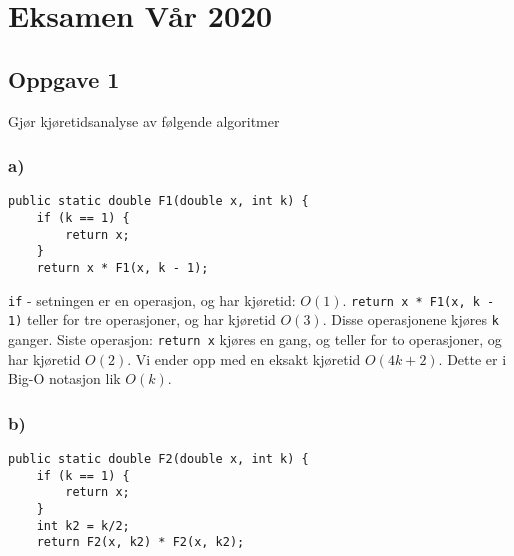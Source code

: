\documentclass{article}
\begin{document}
    \section{Eksamen Vår 2020}
    \subsection{Oppgave 1}
    Gjør kjøretidsanalyse av følgende algoritmer

    \subsubsection{a)}
    \begin{lstlisting}
public static double F1(double x, int k) {
    if (k == 1) {
        return x;    
    }
    return x * F1(x, k - 1);
    \end{lstlisting}

    \begin{ans}
        \texttt{if} - setningen er en operasjon, og har kjøretid: \( O(1) \). \texttt{return x * F1(x, k - 1)} teller for tre operasjoner, og har kjøretid \( O(3) \). Disse operasjonene kjøres \texttt{k} ganger. Siste operasjon: \texttt{return x} kjøres en gang, og teller for to operasjoner, og har kjøretid \( O(2) \). Vi ender opp med en eksakt kjøretid \( O(4k + 2) \). Dette er i Big-O notasjon lik \( O(k) \).

    \end{ans}

    \subsubsection{b)}

    \begin{lstlisting}
public static double F2(double x, int k) {
    if (k == 1) {
        return x;    
    }
    int k2 = k/2;
    return F2(x, k2) * F2(x, k2);
    \end{lstlisting}
\end{document}
